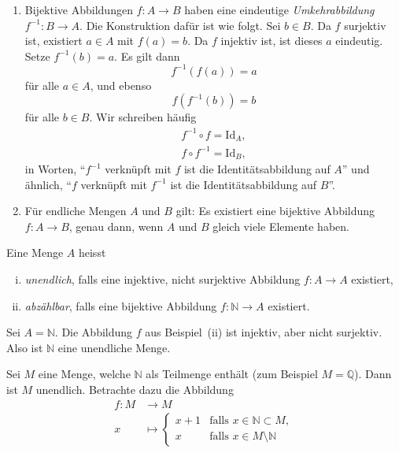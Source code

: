 \documentclass[../main.tex]{subfiles}
\begin{document}
\begin{remarks}
  \leavevmode
  \begin{enumerate}[(1)]
    \item Bijektive Abbildungen $f \colon A \to B$ haben eine eindeutige \emph{Umkehrabbildung}
      $f^{-1} \colon B \to A$. Die Konstruktion dafür ist wie folgt. Sei $b \in B$.
      Da $f$ surjektiv ist, existiert $a \in A$ mit $f(a) = b$. Da $f$
      injektiv ist, ist dieses $a$ eindeutig. Setze $f^{-1}(b) = a$. Es gilt dann
      \[f^{-1}(f(a)) = a\]
      für alle $a \in A$, und ebenso
      \[f(f^{-1}(b)) = b\]
      für alle $b \in B$. Wir schreiben häufig
      \begin{align*}
        f^{-1} \circ f = \textrm{Id}_{A}, \\
        f \circ f^{-1} = \textrm{Id}_{B},
      \end{align*}
      in Worten, ``$f^{-1}$ verknüpft mit $f$ ist die Identitätsabbildung auf $A$''
      und ähnlich, ``$f$ verknüpft mit $f^{-1}$ ist die Identitätsabbildung auf $B$''.
    \item Für endliche Mengen $A$ und $B$ gilt: Es existiert eine bijektive Abbildung
      $f: A \to B$, genau dann, wenn $A$ und $B$ gleich viele Elemente haben.
  \end{enumerate}
\end{remarks}

\begin{definition}
  Eine Menge $A$ heisst
  \begin{enumerate}[(i)]
    \item \emph{unendlich}, falls eine injektive, nicht surjektive Abbildung
      $f: A \to A$ existiert,
    \item \emph{abzählbar}, falls eine bijektive Abbildung $f \colon \mathbb N \to A$
      existiert.
  \end{enumerate}
\end{definition}

\begin{example}
  Sei $A = \mathbb N$. Die Abbildung $f$ aus Beispiel~(ii) ist injektiv,
  aber nicht surjektiv. Also ist $\mathbb N$ eine unendliche Menge.
\end{example}

\begin{example}
  Sei $M$ eine Menge, welche $\mathbb N$ als Teilmenge enthält
  (zum Beispiel $M = \mathbb Q$).
  Dann ist $M$ unendlich. Betrachte dazu die Abbildung
  \begin{align*}
    f \colon M &\to M \\
    x &\mapsto
      \begin{cases}
        x+1 & \mbox{falls }x \in \mathbb N \subset M, \\
        x & \mbox{falls }x \in M \setminus \mathbb N
      \end{cases}
  \end{align*}
\end{example}
\end{document}
